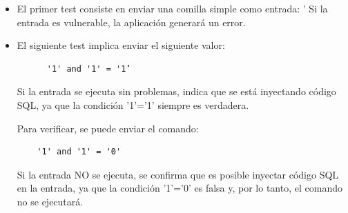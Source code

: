 \documentclass[11pt]{report}
\begin{document}
\begin{itemize}
  \item El primer test consiste en enviar una comilla simple como entrada: 
    '
  Si la entrada es vulnerable, la aplicación generará un error.

  \item El siguiente test implica enviar el siguiente valor:

  \begin{center}
    \begin{BVerbatim}
      '1' and '1' = '1’
    \end{BVerbatim}
  \end{center}

Si la entrada se ejecuta sin problemas, indica que se está inyectando código SQL, ya que la condición '1'='1' siempre es verdadera.

Para verificar, se puede enviar el comando:
\begin{center}
  \begin{BVerbatim}
    '1' and '1' = '0'
  \end{BVerbatim}
\end{center}

Si la entrada NO se ejecuta, se confirma que es posible inyectar código SQL en la entrada, ya que la condición '1'='0' es falsa y, por
lo tanto, el comando no se ejecutará.
\end{itemize}
\end{document}

